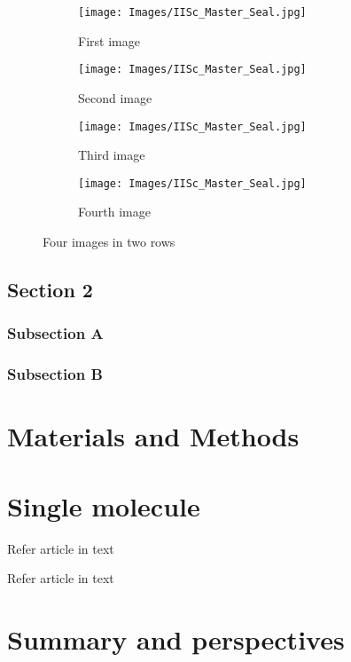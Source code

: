 \documentclass[12pt,twoside,a4paper]{report}
\begin{document}
 \begin{figure}[htbp]
        \centering
        \begin{subfigure}[b]{0.45\textwidth}
            \centering
            \texttt{[image: Images/IISc\_Master\_Seal.jpg]}
            \caption{First image}
            \label{fig:2a}
        \end{subfigure}
        \begin{subfigure}[b]{0.45\textwidth}
            \centering
            \texttt{[image: Images/IISc\_Master\_Seal.jpg]}
            \caption{Second image}
             \label{fig:2b}
        \end{subfigure}
        
        \begin{subfigure}[b]{0.45\textwidth}
            \centering
            \texttt{[image: Images/IISc\_Master\_Seal.jpg]}
            \caption{Third image}
             \label{fig:2c}
        \end{subfigure}
        \begin{subfigure}[b]{0.45\textwidth}
            \centering
            \texttt{[image: Images/IISc\_Master\_Seal.jpg]} %
            \caption{Fourth image}
             \label{fig:2d}
        \end{subfigure}
        \caption{Four images in two rows}
    \end{figure}


\section{Section 2}
\subsection{Subsection A}
\subsection{Subsection B}


\chapter{Materials and Methods}
\chapter{Single molecule}

{\large Refer article in text \cite{einstein} }

{\large Refer article in text \cite{Harsh} }
\chapter{Summary and perspectives}
\lipsum[1-10]


\printbibliography
\end{document}

